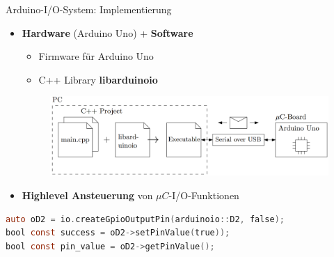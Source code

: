 \documentclass{beamer}
\begin{document}
\begin{frame}[fragile]{Arduino-I/O-System: Implementierung}
	\begin{itemize}
		\item \textbf{Hardware} (Arduino Uno) + \textbf{Software}
		\begin{itemize}
			\item Firmware f\"ur Arduino Uno
			\item C++ Library \textbf{libarduinoio}
		\end{itemize}
		\begin{figure}[htbp]
			\centering
			\includegraphics[scale=0.2]{./images/arduinoio-system-overview.png}
		\end{figure}
		\item \textbf{Highlevel Ansteuerung} von $\mu{}C$-I/O-Funktionen
	\end{itemize}
\begin{lstlisting}[frame=single, language=C]
auto oD2 = io.createGpioOutputPin(arduinoio::D2, false);
bool const success = oD2->setPinValue(true));
bool const pin_value = oD2->getPinValue();
\end{lstlisting}
\end{frame}
\end{document}

